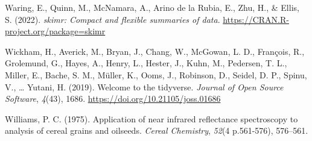 \documentclass[
]{agujournal2019}
\newlength{\cslhangindent}
\newenvironment{CSLReferences}[2] %
 {\begin{list}{}{%
  \setlength{\itemindent}{0pt}
  \setlength{\leftmargin}{0pt}
  \setlength{\parsep}{0pt}
  \ifodd #1
   \setlength{\leftmargin}{\cslhangindent}
   \setlength{\itemindent}{-1\cslhangindent}
  \fi
  \setlength{\itemsep}{#2\baselineskip}}}
 {\end{list}}
\begin{document}
\begin{CSLReferences}{1}{0}
Waring, E., Quinn, M., McNamara, A., Arino de la Rubia, E., Zhu, H., \&
Ellis, S. (2022). \emph{{skimr}: Compact and flexible summaries of
data}. \url{https://CRAN.R-project.org/package=skimr}

Wickham, H., Averick, M., Bryan, J., Chang, W., McGowan, L. D.,
François, R., Grolemund, G., Hayes, A., Henry, L., Hester, J., Kuhn, M.,
Pedersen, T. L., Miller, E., Bache, S. M., Müller, K., Ooms, J.,
Robinson, D., Seidel, D. P., Spinu, V., \ldots{} Yutani, H. (2019).
Welcome to the {tidyverse}. \emph{Journal of Open Source Software},
\emph{4}(43), 1686. \url{https://doi.org/10.21105/joss.01686}

Williams, P. C. (1975). Application of near infrared reflectance
spectroscopy to analysis of cereal grains and oilseeds. \emph{Cereal
Chemistry}, \emph{52}(4 p.561-576), 576--561.

\end{CSLReferences}
\end{document}
